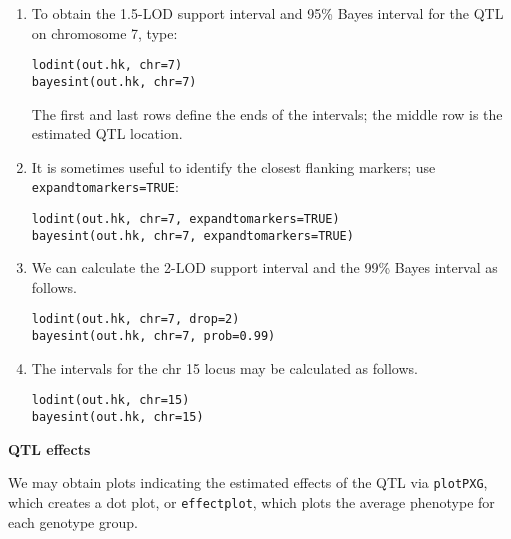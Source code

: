 \documentclass[10pt,letterpaper]{article}
\newcommand{\usercolor}{\color [named]{BlueViolet}}
\begin{document}
\begin{enumerate}
\addtocounter{enumi}{28}
\item To obtain the 1.5-LOD support interval and 95\% Bayes interval
  for the QTL on chromosome 7, type:

\usercolor
\verb|lodint(out.hk, chr=7)| \\
\verb|bayesint(out.hk, chr=7)| 
\normalcolor

The first and last rows define the ends of the intervals; the middle
row is the estimated QTL location.

\item It is sometimes useful to identify the closest flanking markers;
  use \verb-expandtomarkers=TRUE-:

\usercolor
\verb|lodint(out.hk, chr=7, expandtomarkers=TRUE)| \\
\verb|bayesint(out.hk, chr=7, expandtomarkers=TRUE)| 
\normalcolor

\item We can calculate the 2-LOD support interval and the 99\% Bayes
  interval as follows.

\usercolor
\verb|lodint(out.hk, chr=7, drop=2)| \\
\verb|bayesint(out.hk, chr=7, prob=0.99)| 
\normalcolor

\item The intervals for the chr 15 locus may be calculated as follows.

\usercolor
\verb|lodint(out.hk, chr=15)| \\
\verb|bayesint(out.hk, chr=15)| 
\normalcolor

\end{enumerate}

\vspace{12pt}
\textbf{QTL effects} \vspace{6pt}
\nopagebreak

We may obtain plots indicating the estimated effects of the QTL via
\verb-plotPXG-, which creates a dot plot, or \verb-effectplot-, which
plots the average phenotype for each genotype group.
\end{document}
